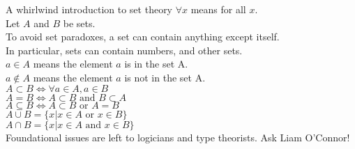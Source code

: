 \documentclass{beamer}
\begin{document}







\begin{frame}{A whirlwind introduction to set theory}
$\forall x$ means for all $x$.\\
Let $A$ and $B$ be sets.\\
To avoid set paradoxes, a set can contain anything except itself.\\
In particular, sets can contain numbers, and other sets.\\
$a \in A$ means the element $a$ is in the set A.\\
$a \notin A$ means the element $a$ is not in the set A.\\
$A \subset B \Leftrightarrow \forall a \in A, a \in B$\\
$A = B \Leftrightarrow A \subset B \text{ and } B \subset A$\\
$A \subseteq B \Leftrightarrow A \subset B \text{ or } A = B$\\
$A \cup B = \{x | x \in A \text{ or } x \in B\}$\\
$A \cap B = \{x | x \in A \text{ and } x \in B\}$\\
Foundational issues are left to logicians and type theorists. Ask Liam O'Connor!
\end{frame}
\end{document}
